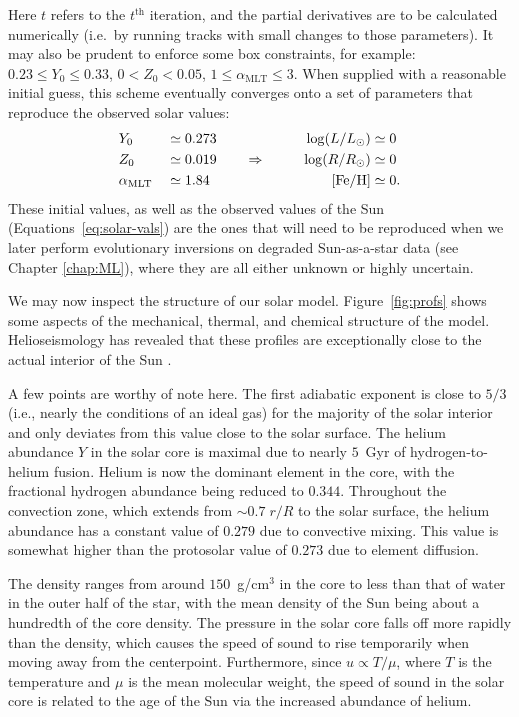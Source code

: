 Here $t$ refers to the $t^{\text{th}}$ iteration, and the partial derivatives are to be calculated numerically (i.e.\ by running tracks with small changes to those parameters). 
It may also be prudent to enforce some box constraints, for example: ${0.23 \leq Y_0 \leq 0.33}$, ${0 < Z_0 < 0.05}$, ${1 \leq \alpha_{\text{MLT}} \leq 3}$. 
When supplied with a reasonable initial guess, this scheme eventually converges onto a set of parameters that reproduce the observed solar values: 
\begin{alignat}{3} \label{eq:solar-cal-vals} 
    &Y_0 &&\simeq 0.273  &\log(L/L_\odot) &\simeq 0 \notag\\
    &Z_0 &&\simeq 0.019 \qquad\Rightarrow\qquad &\log(R/R_\odot) &\simeq 0\\\notag
    &\alpha_{\text{MLT}} &&\simeq 1.84  &\text{[Fe/H]} &\simeq 0.
\end{alignat}
These initial values, as well as the observed values of the Sun (Equations~\ref{eq:solar-vals}) are the ones that will need to be reproduced when we later perform evolutionary inversions on degraded Sun-as-a-star data (see Chapter \ref{chap:ML}), where they are all either unknown or highly uncertain. 

We may now inspect the structure of our solar model. 
Figure~\ref{fig:profs} shows some aspects of the mechanical, thermal, and chemical structure of the model. 
Helioseismology has revealed that these profiles are exceptionally close to the actual interior of the Sun \citep[see, e.g.,][]{2016lrsp...13....2b}. 

A few points are worthy of note here. 
The first adiabatic exponent is close to ${5/3}$ (i.e., nearly the conditions of an ideal gas) for the majority of the solar interior and only deviates from this value close to the solar surface. 
The helium abundance $Y$ in the solar core is maximal due to nearly $5$~Gyr of hydrogen-to-helium fusion. 
Helium is now the dominant element in the core, with the fractional hydrogen abundance being reduced to $0.344$. 
Throughout the convection zone, which extends from ${\sim 0.7\;{r/R}}$ to the solar surface, the helium abundance has a constant value of $0.279$ due to convective mixing. 
This value is somewhat higher than the protosolar value of $0.273$ due to element diffusion. 

The density ranges from around $150$~g/cm$^3$ in the core to less than that of water in the outer half of the star, with the mean density of the Sun being about a hundredth of the core density. 
The pressure in the solar core falls off more rapidly than the density, which causes the speed of sound to rise temporarily when moving away from the centerpoint. 
Furthermore, since $u\propto T/\mu$, where $T$ is the temperature and $\mu$ is the mean molecular weight, the speed of sound in the solar core is related to the age of the Sun via the increased abundance of helium. 


